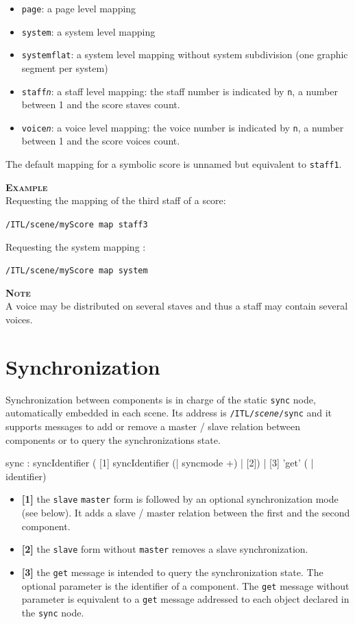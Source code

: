 \documentclass[a4paper,twoside]{report}
\newcommand{\toplevel}[1]	{\chapter{#1}}
\newcommand{\OSC}[1]		{\texttt{#1}}
\newcommand{\example}		{\textbf{\hspace{-1.5cm}\textbf{\textsc{Example }}}}
\newcommand{\note}	[1]		{\vspace{2mm}\textbf{\hspace{-1.03cm}\textbf{\textsc{Note #1}}}}
\newcommand{\sample}	[1]			{\vspace{-2mm}\begin{center}\colorbox{mygrey}{
								\begin{minipage}[t]{0.9\columnwidth} 
								{\small \texttt{#1}}
								\end{minipage}}\end{center}}
\begin{document}
\begin{itemize}
\item \OSC{page}: a page level mapping
\item \OSC{system}: a system level mapping
\item \OSC{systemflat}: a system level mapping without system subdivision (one graphic segment per system)
\item \OSC{staff\textit{n}}: a staff level mapping: the staff number is indicated by \OSC{n}, a number between 1 and the score staves count.
\item \OSC{voice\textit{n}}: a voice level mapping: the voice number is indicated by \OSC{n}, a number between 1 and the score voices count.
\end{itemize}

The default mapping for a symbolic score is unnamed but equivalent to \OSC{staff1}.

\example \\
Requesting the mapping of the third staff of a score:
\sample{/ITL/scene/myScore map staff3}
Requesting the system mapping :
\sample{/ITL/scene/myScore map system}

\note{} \\
A voice may be distributed on several staves and thus a staff may contain several voices.


\toplevel{Synchronization}
\label{syncmsg}

Synchronization between components is in charge of the static \OSC{sync} node, automatically embedded in each scene. Its address is \OSC{/ITL/\textit{scene}/sync} and it supports messages to add or remove a master / slave relation between components or to query the synchronizations state.
\begin{rail}
sync : syncIdentifier 
	 ( [1] syncIdentifier (| syncmode +) 
	   | [2])
	   | [3] 'get' ( | identifier)
\end{rail}


\begin{itemize}
\item \textbf{[1]} the \OSC{slave} \OSC{master} form is followed by an optional synchronization mode (see below). It adds a slave / master relation between the first and the second component.
\item \textbf{[2]} the \OSC{slave} form without \OSC{master} removes a slave synchronization.
\item \textbf{[3]} the \OSC{get} message is intended to query the synchronization state. The optional parameter is the identifier of a component. The \OSC{get} message without parameter is equivalent to a \OSC{get} message addressed to each object declared in the \OSC{sync} node.
\end{itemize}
\end{document}
